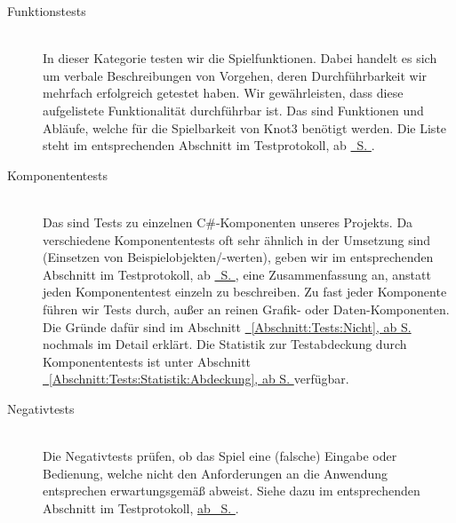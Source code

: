 \begin{description}



	\item[Funktionstests] \hfill
	\\
	
	In dieser Kategorie testen wir die Spielfunktionen. Dabei handelt es sich um verbale Beschreibungen von Vorgehen, deren Durchführbarkeit wir mehrfach erfolgreich getestet haben. Wir gewährleisten, dass diese aufgelistete Funktionalität durchführbar ist. Das sind Funktionen und Abläufe, welche für die Spielbarkeit von Knot3 benötigt werden. Die Liste steht im entsprechenden Abschnitt im Testprotokoll, ab \hyperref[Abschnitt:Tests:Protokoll:Funktion]{\mousecursor~S. \pageref{Abschnitt:Tests:Protokoll:Funktion}}.\\


	
	\item[Komponententests] \hfill
	\\
	
	Das sind Tests zu einzelnen C\#-Komponenten unseres Projekts. Da verschiedene Komponententests oft sehr ähnlich in der Umsetzung sind (Einsetzen von Beispielobjekten/-werten), geben wir im entsprechenden Abschnitt im Testprotokoll, ab \hyperref[Abschnitt:Tests:Protokoll:Komponenten]{\mousecursor~S. \pageref{Abschnitt:Tests:Protokoll:Komponenten}}, eine Zusammenfassung an, anstatt jeden Komponententest einzeln zu beschreiben.
	Zu fast jeder Komponente führen wir Tests durch, außer an reinen Grafik- oder Daten-Komponenten. Die Gründe dafür sind im Abschnitt \hyperref[Abschnitt:Tests:Nicht]{\mousecursor~\ref{Abschnitt:Tests:Nicht}, ab S. \pageref{Abschnitt:Tests:Nicht}} nochmals im Detail erklärt. Die Statistik zur Testabdeckung durch Komponententests ist unter Abschnitt \hyperref[Abschnitt:Tests:Statistik:Abdeckung]{\mousecursor~\ref{Abschnitt:Tests:Statistik:Abdeckung}, ab S. \pageref{Abschnitt:Tests:Statistik:Abdeckung}} verfügbar.\\


\clearpage



	\item[Negativtests] \hfill
	\\
	
	Die Negativtests prüfen, ob das Spiel eine (falsche) Eingabe oder Bedienung, welche nicht den Anforderungen an die Anwendung entsprechen erwartungsgemäß abweist. Siehe dazu im entsprechenden Abschnitt im Testprotokoll, \hyperref[Abschnitt:Tests:Protokoll:Negativ]{ab \mousecursor~S. \pageref{Abschnitt:Tests:Protokoll:Negativ}}.\\
		


\end{description}
